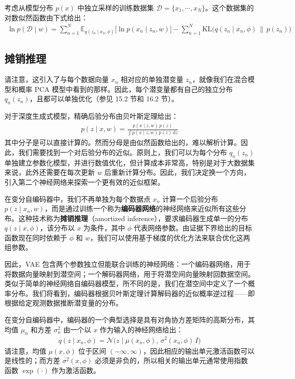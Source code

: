 \documentclass[../../main.tex]{subfiles}
\begin{document}
考虑从模型分布 $p(x)$ 中独立采样的训练数据集 $\mathcal{D}=\{x_1,\cdots,x_N\}$。这个数据集的对数似然函数由下式给出：
\begin{align}
\ln p(\mathcal{D}\mid w)=\sum_{n=1}^{N}\mathbb{E}_{q(z_n\mid x_n,\phi)}\Big[\ln p(x_n\mid z_n,w)\Big]-\sum_{n=1}^{N}\mathrm{KL}\big(q(z_n\mid x_n,\phi)\,\|\,p(z_n)\big)
\label{align:ch19-total-elbo}
\end{align}

\subsection{摊销推理}\label{subsection:ch19-摊销推理}

请注意，这引入了与每个数据向量 $x_n$ 相对应的单独潜变量 $z_n$，就像我们在混合模型和概率 PCA 模型中看到的那样。因此，每个潜变量都有自己的独立分布 $q_n(z_n)$，且都可以单独优化（参见 15.2 节和 16.2 节）。

对于深度生成式模型，精确后验分布由贝叶斯定理给出：
\begin{align}
p(z\mid x,w)=\frac{p(x\mid z,w)\,p(z)}{\int p(x\mid z,w)\,p(z)\,\mathrm{d}z}
\label{align:ch19-posterior}
\end{align}
其中分子是可以直接计算的。然而分母是由似然函数给出的，难以解析计算。因此，我们需要找到一个对后验分布的近似。原则上，我们可以为每个分布 $q_n(z_n)$ 单独建立参数化模型，并进行数值优化，但计算成本非常高，特别是对于大数据集来说，此外还需要在每次更新 $w$ 后重新计算分布。因此，我们决定换一个方向，引入第二个神经网络来探索一个更有效的近似框架。

在变分自编码器中，我们不再单独为每个数据点 $x_n$ 计算一个后验分布 $p(z\mid x_n,w)$，而是通过训练一个称为\textbf{编码器网络}的神经网络来近似所有这些分布。这种技术称为\textbf{摊销推理}（amortized inference），要求编码器生成单一的分布 $q(z\mid x,\phi)$，该分布以 $x$ 为条件，其中 $\phi$ 代表网络参数。由证据下界给出的目标函数现在同时依赖于 $\phi$ 和 $w$，我们可以使用基于梯度的优化方法来联合优化这两组参数。

因此，VAE 包含两个参数独立但能联合训练的神经网络：一个编码器网络，用于将数据向量映射到潜空间；一个解码器网络，用于将潜空间向量映射回数据空间。类似于简单的神经网络自编码器模型，所不同的是，我们在潜空间中定义了一个概率分布。我们将看到，编码器根据贝叶斯定理计算解码器的近似概率逆过程——即根据给定观测数据推断潜变量的分布。

在变分自编码器中，编码器的一个典型选择是具有对角协方差矩阵的高斯分布，其均值 $\mu_n$ 和方差 $\sigma_n^2$ 由一个以 $x$ 作为输入的神经网络给出：
\begin{align}
q(z\mid x_n,\phi)=\mathcal{N}\big(z\mid \mu(x_n,\phi),\,\sigma^2(x_n,\phi)\,I\big)
\label{align:ch19-encoder}
\end{align}
请注意，均值 $\mu(x,\phi)$ 位于区间 $(-\infty,\infty)$，因此相应的输出单元激活函数可以是线性的；而方差 $\sigma^2(x,\phi)$ 必须是非负的，所以相关的输出单元通常使用指数函数 $\exp(\cdot)$ 作为激活函数。
\end{document}
